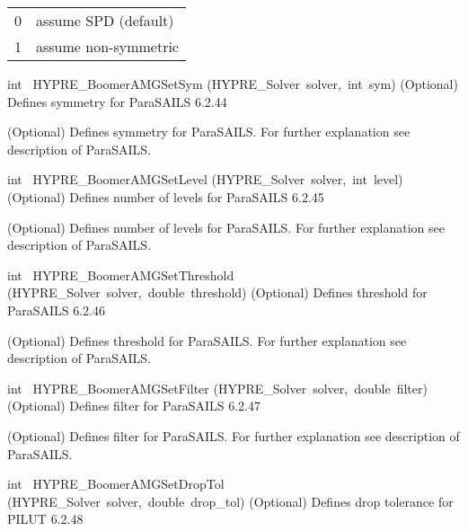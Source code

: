 \documentclass{article}
\begin{document}
\begin{cxxentry}
\begin{cxxentry}
\begin{cxxfunction}
\begin{cxxdoc}
\begin{tabular}{|c|l|} \hline
0  & assume SPD (default) \\
1  & assume non-symmetric \\
\hline
\end{tabular}
\end{cxxdoc}
\end{cxxfunction}
\begin{cxxfunction}
{int\ }
        {HYPRE\_BoomerAMGSetSym}
        {(HYPRE\_Solver\ solver,\ int\ sym)}
        {
(Optional) Defines symmetry for ParaSAILS}
        {6.2.44}
\begin{cxxdoc}

(Optional) Defines symmetry for ParaSAILS. 
For further explanation see description of ParaSAILS.
\end{cxxdoc}
\end{cxxfunction}
\begin{cxxfunction}
{int\ }
        {HYPRE\_BoomerAMGSetLevel}
        {(HYPRE\_Solver\ solver,\ int\ level)}
        {
(Optional) Defines number of levels for ParaSAILS}
        {6.2.45}
\begin{cxxdoc}

(Optional) Defines number of levels for ParaSAILS.
For further explanation see description of ParaSAILS.
\end{cxxdoc}
\end{cxxfunction}
\begin{cxxfunction}
{int\ }
        {HYPRE\_BoomerAMGSetThreshold}
        {(HYPRE\_Solver\ solver,\ double\ threshold)}
        {
(Optional) Defines threshold for ParaSAILS}
        {6.2.46}
\begin{cxxdoc}

(Optional) Defines threshold for ParaSAILS.
For further explanation see description of ParaSAILS.
\end{cxxdoc}
\end{cxxfunction}
\begin{cxxfunction}
{int\ }
        {HYPRE\_BoomerAMGSetFilter}
        {(HYPRE\_Solver\ solver,\ double\ filter)}
        {
(Optional) Defines filter for ParaSAILS}
        {6.2.47}
\begin{cxxdoc}

(Optional) Defines filter for ParaSAILS.
For further explanation see description of ParaSAILS.
\end{cxxdoc}
\end{cxxfunction}
\begin{cxxfunction}
{int\ }
        {HYPRE\_BoomerAMGSetDropTol}
        {(HYPRE\_Solver\ solver,\ double\ drop\_tol)}
        {
(Optional) Defines drop tolerance for PILUT}
        {6.2.48}
\begin{cxxdoc}


\end{cxxdoc}
\end{cxxfunction}
\end{cxxentry}
\end{cxxentry}
\end{document}
